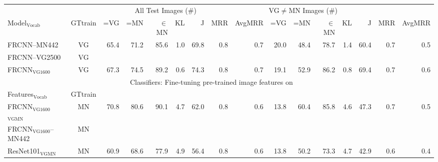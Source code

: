 \begin{table*}[t]
	\centering
	\small
	\begin{tabular}{l|c|r@{~}r@{~}r@{~}r@{~}r@{~}r@{~}r|@{~}r@{~}r@{~}r@{~}r@{~}r@{~}r@{~}r@{~}}
		\toprule
		&   & \multicolumn{6}{c}{All Test Images ($\#$)} 
		& \multicolumn{6}{c}{VG$\neq$MN Images ($\#$)}\\	
		Model$_{\text{Vocab}}$	 
		&  GTtrain &  =VG & =MN & $\in$MN  & KL & J & MRR & AvgMRR 
		&  =VG & =MN & $\in$MN  & KL & J & MRR & AvgMRR\\ 
		\midrule
		FRCNN--MN442 & VG &            65.4 &              71.2 &                85.6 &         1.0 &             69.8 &          0.8 &             0.7 &            20.0 &              48.4 &                78.7 &         1.4 &             60.4 &          0.7 &             0.5 \\
		FRCNN--VG2500 & VG \\
		FRCNN$_{\text{VG1600}}$ & VG &            67.3 &              74.5 &                89.2 &         0.6 &             74.3 &          0.8 &             0.7 &            19.1 &              52.9 &                86.2 &         0.8 &             69.4 &          0.7 &             0.6 \\
		\midrule \midrule
		& \multicolumn{12}{c}{Classifiers: Fine-tuning pre-trained image features on \mn}\\
		Features$_{\text{Vocab}}$ & GTtrain  \\
		\midrule 
		FRCNN$_{\text{VG1600}}$$_{\text{VGMN}}$ & MN &            70.8 &              80.6 &                90.1 &         4.7 &             62.0 &          0.8 &             0.6 &            13.8 &              60.4 &                85.8 &         4.6 &             47.3 &          0.7 &             0.5 \\ 
		FRCNN$_{\text{VG1600}}$--MN442 &  MN \\
		\midrule
		ResNet101$_{\text{VGMN}}$ & MN  &            60.9 &              68.6 &                77.9 &         4.9 &             56.4 &          0.8 &             0.6 &            13.8 &              50.2 &                73.3 &         4.7 &             42.9 &          0.6 &             0.4 \\
		

\end{tabular}
\end{table*}
